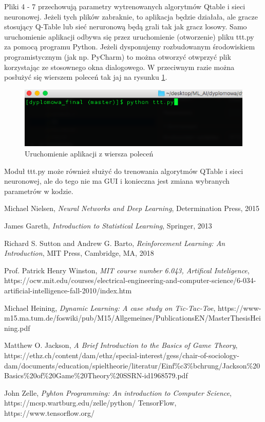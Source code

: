 \documentclass[licencjacka]{pracamgr}
\begin{document}
Pliki 4 - 7 przechowują parametry wytrenowanych algorytmów Qtable i sieci neuronowej. Jeżeli tych plików zabraknie, to aplikacja będzie działała, ale gracze stosujący Q-Table lub sieć neruronową będą grali tak jak gracz losowy. Samo uruchomienie aplikacji odbywa się przez uruchomienie (otworzenie) pliku ttt.py za pomocą programu Python. Jeżeli dysponujemy rozbudowanym środowiskiem programistycznym (jak np. PyCharm) to można otworzyć otwprzyć plik korzystając ze stosownego okna dialogowego. W przeciwnym razie można posłużyć się wierszem poleceń tak jaj na rysunku \ref{Rys35}. 


\begin{figure}[h!]
	\includegraphics [scale=0.5] {uruchamianie.png}
	\caption{Uruchomienie aplikacji z wiersza poleceń}
	\label{Rys35}
\end{figure} 


Moduł ttt.py może również służyć do trenowania algorytmów QTable i sieci neuronowej, ale do tego nie ma GUI i konieczna jest zmiana wybranych parametrów w kodzie. 

\begin{thebibliography}{99}


	 Michael Nielsen, \textit{Neural Networks and Deep Learning}, Determination Press, 2015

	 James Gareth, \textit{Introduction to Statistical Learning}, Springer, 2013
	
	 Richard S. Sutton and Andrew G. Barto, \textit{Reinforcement Learning: An Introduction},  MIT Press, Cambridge, MA, 2018
	
	 Prof. Patrick Henry Winston, \textit{MIT course number 6.043, Artifical Inteligence}, https://ocw.mit.edu/courses/electrical-engineering-and-computer-science/6-034-artificial-intelligence-fall-2010/index.htm

	 Michael Heining, \textit{Dynamic Learning: A case study on Tic-Tac-Toe}, https://www-m15.ma.tum.de/foswiki/pub/M15/Allgemeines/PublicationsEN/MasterThesisHeining.pdf
	
	  Matthew O. Jackson, \textit{A Brief Introduction to the Basics of Game Theory}, \linebreak https://ethz.ch/content/dam/ethz/special-interest/gess/chair-of-sociology-dam/documents/education/spieltheorie/literatur/Einf\%c3\%bchrung/\linebreak Jackson\%20Basics\%20of\%20Game\%20Theory\%20SSRN-id1968579.pdf

	 John Zelle,  \textit{Pyhton Programming: An introduction to Computer Science}, https://mcsp.wartburg.edu/zelle/python/
	 TensorFlow, https://www.tensorflow.org/

\end{thebibliography}
\end{document}
